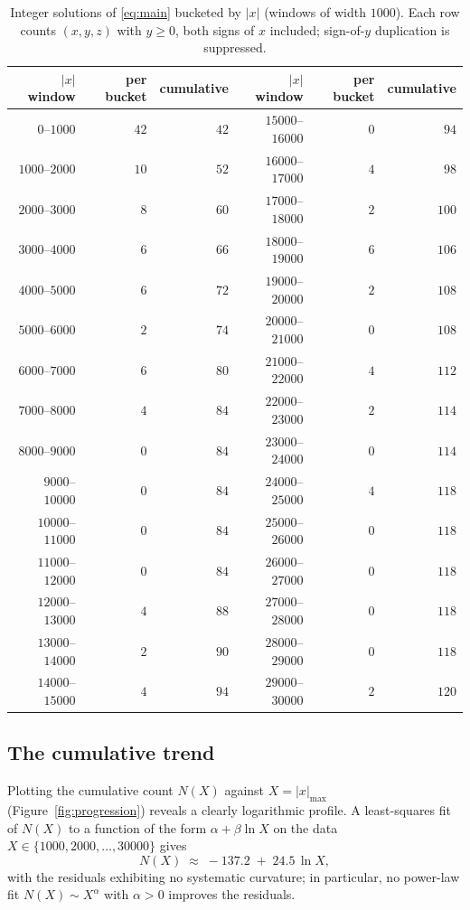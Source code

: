 \documentclass[12pt,a4paper]{article}
\theoremstyle{definition}
\begin{document}
\begin{table}[ht]
\centering
\begin{tabular}{r r r @{\hskip 2em} r r r}
\toprule
$|x|$ window & per bucket & cumulative & $|x|$ window & per bucket & cumulative \\
\midrule
$0$--$1000$    & $42$ & $42$  & $15000$--$16000$ & $0$ & $94$  \\
$1000$--$2000$ & $10$ & $52$  & $16000$--$17000$ & $4$ & $98$  \\
$2000$--$3000$ & $8$  & $60$  & $17000$--$18000$ & $2$ & $100$ \\
$3000$--$4000$ & $6$  & $66$  & $18000$--$19000$ & $6$ & $106$ \\
$4000$--$5000$ & $6$  & $72$  & $19000$--$20000$ & $2$ & $108$ \\
$5000$--$6000$ & $2$  & $74$  & $20000$--$21000$ & $0$ & $108$ \\
$6000$--$7000$ & $6$  & $80$  & $21000$--$22000$ & $4$ & $112$ \\
$7000$--$8000$ & $4$  & $84$  & $22000$--$23000$ & $2$ & $114$ \\
$8000$--$9000$ & $0$  & $84$  & $23000$--$24000$ & $0$ & $114$ \\
$9000$--$10000$& $0$  & $84$  & $24000$--$25000$ & $4$ & $118$ \\
$10000$--$11000$&$0$  & $84$  & $25000$--$26000$ & $0$ & $118$ \\
$11000$--$12000$&$0$  & $84$  & $26000$--$27000$ & $0$ & $118$ \\
$12000$--$13000$&$4$  & $88$  & $27000$--$28000$ & $0$ & $118$ \\
$13000$--$14000$&$2$  & $90$  & $28000$--$29000$ & $0$ & $118$ \\
$14000$--$15000$&$4$  & $94$  & $29000$--$30000$ & $2$ & $120$ \\
\bottomrule
\end{tabular}
\caption{\label{tab:buckets}Integer solutions of \eqref{eq:main}
bucketed by $|x|$ (windows of width $1000$).  Each row counts
$(x,y,z)$ with $y\ge0$, both signs of $x$ included; sign-of-$y$
duplication is suppressed.}
\end{table}

\subsection{The cumulative trend}

Plotting the cumulative count $N(X)$ against $X=|x|_{\max}$
(Figure~\ref{fig:progression}) reveals a clearly logarithmic profile.
A least-squares fit of $N(X)$ to a function of the form
$\alpha+\beta\ln X$ on the data $X\in\{1000,2000,\dots,30000\}$ gives
\begin{equation}
  N(X)\;\approx\;-137.2\;+\;24.5\,\ln X,
  \label{eq:logfit}
\end{equation}
with the residuals exhibiting no systematic curvature; in particular,
no power-law fit $N(X)\sim X^{\alpha}$ with $\alpha>0$ improves the
residuals.
\end{document}

